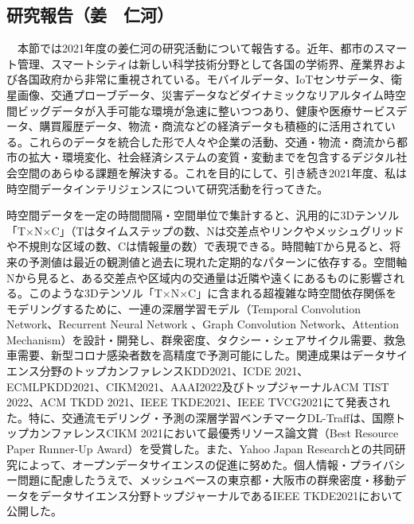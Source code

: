 \subsection{研究報告（姜　仁河）}
　本節では2021年度の姜仁河の研究活動について報告する。近年、都市のスマート管理、スマートシティは新しい科学技術分野として各国の学術界、産業界および各国政府から非常に重視されている。モバイルデータ、IoTセンサデータ、衛星画像、交通プローブデータ、災害データなどダイナミックなリアルタイム時空間ビッグデータが入手可能な環境が急速に整いつつあり、健康や医療サービスデータ、購買履歴データ、物流・商流などの経済データも積極的に活用されている。これらのデータを統合した形で人々や企業の活動、交通・物流・商流から都市の拡大・環境変化、社会経済システムの変質・変動までを包含するデジタル社会空間のあらゆる課題を解決する。これを目的にして、引き続き2021年度、私は時空間データインテリジェンスについて研究活動を行ってきた。

時空間データを一定の時間間隔・空間単位で集計すると、汎用的に3Dテンソル「T×N×C」（Tはタイムステップの数、Nは交差点やリンクやメッシュグリッドや不規則な区域の数、Cは情報量の数）で表現できる。時間軸Tから見ると、将来の予測値は最近の観測値と過去に現れた定期的なパターンに依存する。空間軸Nから見ると、ある交差点や区域内の交通量は近隣や遠くにあるものに影響される。このような3Dテンソル「T×N×C」に含まれる超複雑な時空間依存関係をモデリングするために、一連の深層学習モデル（Temporal Convolution Network、Recurrent Neural Network 、Graph Convolution Network、Attention Mechanism）を設計・開発し、群衆密度、タクシー・シェアサイクル需要、救急車需要、新型コロナ感染者数を高精度で予測可能にした。関連成果はデータサイエンス分野のトップカンファレンスKDD2021、ICDE 2021、ECMLPKDD2021、CIKM2021、AAAI2022\cite{JIANG2-1,JIANG2-2,JIANG2-3,JIANG2-4,JIANG2-5,JIANG2-6}及びトップジャーナルACM TIST 2022、ACM TKDD 2021、IEEE TKDE2021、IEEE TVCG2021\cite{JIANG1-1,JIANG1-2,JIANG1-3,JIANG1-4,JIANG1-5}にて発表された。特に、交通流モデリング・予測の深層学習ベンチマークDL-Traff\cite{JIANG2-3}は、国際トップカンファレンスCIKM 2021において最優秀リソース論文賞（Best Resource Paper Runner-Up Award）を受賞した。また、Yahoo Japan Researchとの共同研究によって、オープンデータサイエンスの促進に努めた。個人情報・プライバシー問題に配慮したうえで、メッシュベースの東京都・大阪市の群衆密度・移動データをデータサイエンス分野トップジャーナルであるIEEE TKDE2021\cite{JIANG1-4}において公開した。

